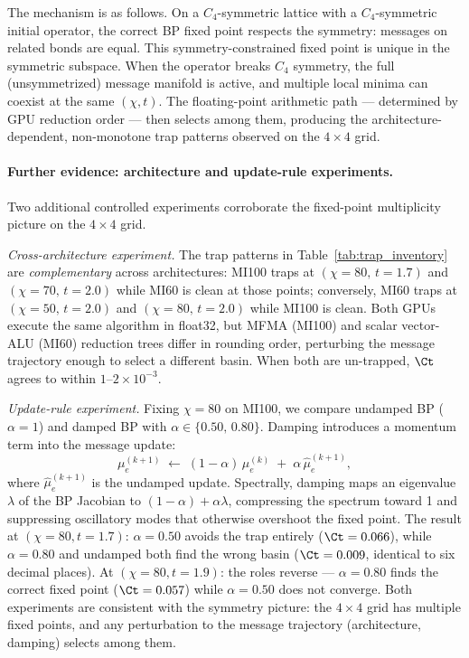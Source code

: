 The mechanism is as follows.
On a $C_4$-symmetric lattice with a $C_4$-symmetric initial operator, the
correct BP fixed point respects the symmetry: messages on related bonds are
equal.
This symmetry-constrained fixed point is unique in the symmetric subspace.
When the operator breaks $C_4$ symmetry, the full (unsymmetrized) message
manifold is active, and multiple local minima can coexist at the same $(\chi,
t)$.
The floating-point arithmetic path --- determined by GPU reduction order ---
then selects among them, producing the architecture-dependent, non-monotone
trap patterns observed on the $4\times4$ grid.

\paragraph{Further evidence: architecture and update-rule experiments.}
Two additional controlled experiments corroborate the fixed-point multiplicity
picture on the $4\times4$ grid.

\emph{Cross-architecture experiment.}
The trap patterns in Table~\ref{tab:trap_inventory} are \emph{complementary} across
architectures: MI100 traps at $(\chi=80,\,t=1.7)$ and $(\chi=70,\,t=2.0)$
while MI60 is clean at those points; conversely, MI60 traps at
$(\chi=50,\,t=2.0)$ and $(\chi=80,\,t=2.0)$ while MI100 is clean.
Both GPUs execute the same algorithm in float32, but MFMA (MI100) and
scalar vector-ALU (MI60) reduction trees differ in rounding order,
perturbing the message trajectory enough to select a different basin.
When both are un-trapped, $\Ct$ agrees to within $1$--$2\times10^{-3}$.

\emph{Update-rule experiment.}
Fixing $\chi=80$ on MI100, we compare undamped BP ($\alpha=1$) and damped BP
with $\alpha \in \{0.50,\, 0.80\}$.
Damping introduces a momentum term into the message update:
\begin{equation}
  \mu_e^{(k+1)}
  \;\leftarrow\;
  (1-\alpha)\,\mu_e^{(k)} \;+\; \alpha\,\hat{\mu}_e^{(k+1)},
  \label{eq:damping}
\end{equation}
where $\hat{\mu}_e^{(k+1)}$ is the undamped update.
Spectrally, damping maps an eigenvalue $\lambda$ of the BP Jacobian to
$(1-\alpha) + \alpha\lambda$, compressing the spectrum toward 1 and
suppressing oscillatory modes that otherwise overshoot the fixed point.
The result at $(\chi=80, t=1.7)$: $\alpha=0.50$ avoids the trap entirely
($\Ct = 0.066$), while $\alpha=0.80$ and undamped both find the wrong basin
($\Ct = 0.009$, identical to six decimal places).
At $(\chi=80, t=1.9)$: the roles reverse --- $\alpha=0.80$ finds the correct
fixed point ($\Ct = 0.057$) while $\alpha=0.50$ does not converge.
Both experiments are consistent with the symmetry picture: the $4\times4$ grid
has multiple fixed points, and any perturbation to the message trajectory
(architecture, damping) selects among them.

